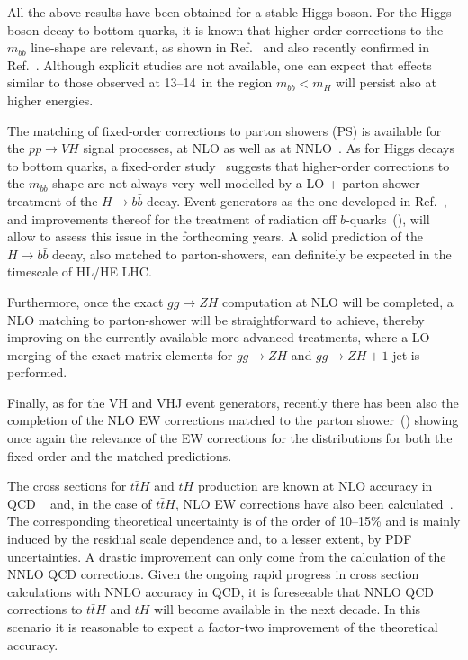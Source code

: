 All the above results have been obtained for a stable Higgs boson. For
the Higgs boson decay to bottom quarks, it is known that higher-order
corrections to the $m_{bb}$ line-shape are relevant, as shown in
Ref.~\cite{Ferrera:2017zex} and also recently confirmed
in Ref.~\cite{Caola:2017xuq}.  Although explicit studies are not available,
one can expect that effects similar to those observed at 13--14~\UTeV in
the region $m_{bb}<m_H$ will persist also at higher energies.

The matching of fixed-order corrections to parton showers (PS) is
available for the $pp\rightarrow VH$ signal processes, at NLO as well
as at NNLO~\cite{Astill:2016hpa,Astill:2018ivh}.
As for Higgs decays to bottom quarks, a fixed-order study~\cite{Caola:2017xuq}
suggests that higher-order corrections to the $m_{bb}$ shape are not always
very well modelled by a LO + parton shower treatment of the $H\to b\bar{b}$ decay.
Event generators as the one developed in Ref.~\cite{Astill:2018ivh}, and improvements thereof
for the treatment of radiation off $b$-quarks~(\cite{Buonocore:2017lry}),
will allow to assess this issue in the forthcoming
years. A solid prediction of the $H\to b\bar{b}$ decay, also matched to
parton-showers, can definitely be expected in the timescale of HL/HE LHC.

Furthermore, once the exact $gg\rightarrow ZH$ computation at NLO will
be completed, a NLO matching to parton-shower will be straightforward
to achieve, thereby improving on the currently available more advanced
treatments, where a LO-merging of the exact matrix elements for
$gg\rightarrow ZH$ and $gg\rightarrow ZH+1$-jet is performed.

Finally, as for the VH and VHJ event generators, recently there has been
also the completion of the NLO EW corrections matched to the parton
shower~(\cite{Granata:2017iod}) showing once again the relevance of the
EW corrections for the distributions for both the fixed order and the
matched predictions.

 

\label{sec:hl-lhc-ttH}
The cross sections for $t\bar t H$ and $tH$ production are known at NLO accuracy in QCD ~\cite{Beenakker:2001rj,Reina:2001sf,Biswas:2012bd} and, in the
case of $t \bar t H$, NLO EW corrections have also been calculated~\cite{Yu:2014cka,Frixione:2014qaa}. The corresponding
theoretical uncertainty is of the order of 10--15\% and is mainly induced by the
residual scale dependence and, to a lesser extent, by PDF uncertainties. A
drastic improvement can only come from the calculation of the NNLO QCD
corrections. Given the ongoing rapid progress in cross section calculations with NNLO accuracy in QCD, it is
foreseeable that NNLO QCD corrections to $t\bar t H$ and $tH$ will become available in the
next decade. In this scenario it is reasonable to expect a factor-two
improvement of the theoretical accuracy.

